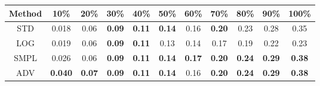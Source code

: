 \documentclass{standalone}
\begin{document}
\begin{tabular}{c|cccccccccc}
      \toprule
      Method & 10\% & 20\% & 30\% & 40\% & 50\% & 60\% & 70\% & 80\% & 90\% & 100\% \\
      \midrule
STD & 0.018 & 0.06 & \textbf{0.09} & \textbf{0.11} & \textbf{0.14} & 0.16 & \textbf{0.20} & 0.23 & 0.28 & 0.35\\
LOG & 0.019 & 0.06 & \textbf{0.09} & \textbf{0.11} & 0.13 & 0.14 & 0.17 & 0.19 & 0.22 & 0.23\\
SMPL & 0.026 & 0.06 & \textbf{0.09} & \textbf{0.11} & \textbf{0.14} & \textbf{0.17} & \textbf{0.20} & \textbf{0.24} & \textbf{0.29} & \textbf{0.38}\\
ADV & \textbf{0.040} & \textbf{0.07} & \textbf{0.09} & \textbf{0.11} & \textbf{0.14} & 0.16 & \textbf{0.20} & \textbf{0.24} & \textbf{0.29} & \textbf{0.38}\\
  \bottomrule
\end{tabular}
\end{document}
